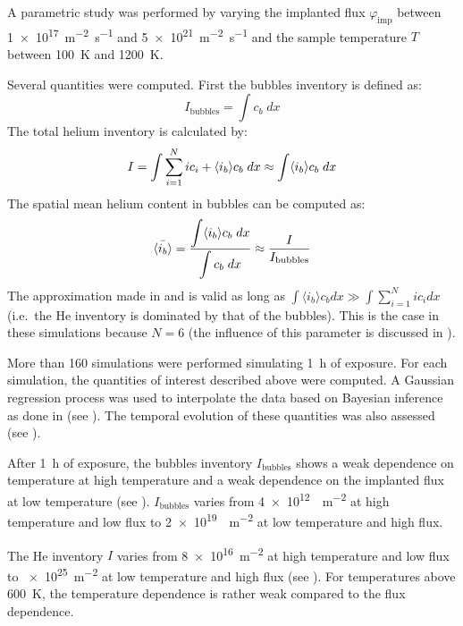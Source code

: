A parametric study was performed by varying the implanted flux $\varphi_\mathrm{imp}$ between \SI{1e17}{m^{-2} s^{-1}} and \SI{5e21}{m^{-2} s^{-1}} and the sample temperature $T$ between \SI{100}{K} and \SI{1200}{K}.

Several quantities were computed.
First the bubbles inventory is defined as:
\begin{equation}
    I_\mathrm{bubbles}= \displaystyle \int c_b \; dx
\end{equation}
The total helium inventory is calculated by:
\begin{equation}
        I = \displaystyle \int \sum\limits_{i=1}^N i c_i + \langle i_b \rangle c_b \; dx
        \approx \displaystyle \int \langle i_b \rangle c_b \; dx
    \labeq{I}
\end{equation}
The spatial mean helium content in bubbles can be computed as:
\begin{equation}
        \Bar{\langle i_b \rangle} = \frac{\displaystyle \int \langle i_b \rangle c_b \; dx}{\displaystyle \int c_b \; dx}
        \approx \frac{I}{I_\mathrm{bubbles}}
    \labeq{mean ib}
\end{equation}
The approximation made in  and  is valid as long as $\int \langle i_b \rangle c_b dx \gg  \int \sum\limits_{i=1}^N i c_i dx$ (i.e.\ the He inventory is dominated by that of the bubbles).
This is the case in these simulations because $N=6$ (the influence of this parameter is discussed in ).

More than 160 simulations were performed simulating \SI{1}{h} of exposure.
For each simulation, the quantities of interest described above were computed.
A Gaussian regression process  was used to interpolate the data based on Bayesian inference as done in  (see ).
The temporal evolution of these quantities was also assessed (see ).

After \SI{1}{h} of exposure, the bubbles inventory $I_\mathrm{bubbles}$ shows a weak dependence on temperature at high temperature and a weak dependence on the implanted flux at low temperature (see ).
$I_\mathrm{bubbles}$ varies from \SI{4e12}{ m^{-2}} at high temperature and low flux to \SI{2e19}{ m^{-2}} at low temperature and high flux.

The \gls{He} inventory $I$ varies from \SI{8e16}{m^{-2}} at high temperature and low flux to \SI{e25}{m^{-2}} at low temperature and high flux (see ).
For temperatures above \SI{600}{K}, the temperature dependence is rather weak compared to the flux dependence.

